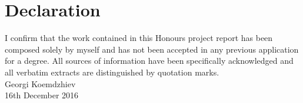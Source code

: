 \chapter{Declaration}
I confirm that the work contained in this Honours project report has been composed solely by myself and has not been accepted in any previous application for a degree. All sources of information have been specifically acknowledged and all verbatim extracts are distinguished by quotation marks.\\[2cm]

  \noindent Georgi Koemdzhiev\\
  16th December 2016